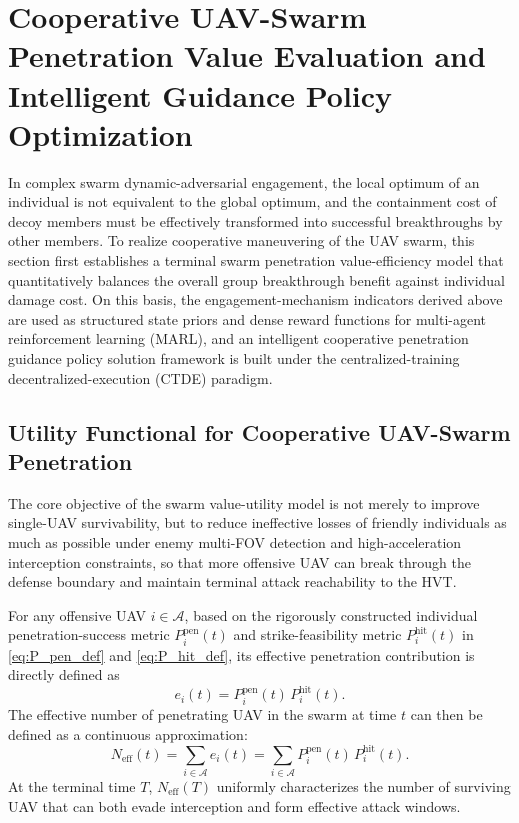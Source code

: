 \documentclass{cja}
\begin{document}
\section{Cooperative UAV-Swarm Penetration Value Evaluation and Intelligent Guidance Policy Optimization}

In complex swarm dynamic-adversarial engagement, the local optimum of an individual is not equivalent to the global optimum, and the containment cost of decoy members must be effectively transformed into successful breakthroughs by other members.
To realize cooperative maneuvering of the UAV swarm, this section first establishes a terminal swarm penetration value-efficiency model that quantitatively balances the overall group breakthrough benefit against individual damage cost. On this basis, the engagement-mechanism indicators derived above are used as structured state priors and dense reward functions for multi-agent reinforcement learning (MARL), and an intelligent cooperative penetration guidance policy solution framework is built under the centralized-training decentralized-execution (CTDE) paradigm.

\subsection{Utility Functional for Cooperative UAV-Swarm Penetration}

The core objective of the swarm value-utility model is not merely to improve single-UAV survivability, but to reduce ineffective losses of friendly individuals as much as possible under enemy multi-FOV detection and high-acceleration interception constraints, so that more offensive UAV can break through the defense boundary and maintain terminal attack reachability to the HVT.

For any offensive UAV $i\in\mathcal{A}$, based on the rigorously constructed individual penetration-success metric $P_i^{\mathrm{pen}}(t)$ and strike-feasibility metric $P_i^{\mathrm{hit}}(t)$ in \eqref{eq:P_pen_def} and \eqref{eq:P_hit_def}, its effective penetration contribution is directly defined as
\begin{equation}
e_i(t)
=
P_i^{\mathrm{pen}}(t)\,P_i^{\mathrm{hit}}(t).
\end{equation}
The effective number of penetrating UAV in the swarm at time $t$ can then be defined as a continuous approximation:
\begin{equation}
N_{\mathrm{eff}}(t)
=
\sum_{i\in\mathcal{A}} e_i(t)
=
\sum_{i\in\mathcal{A}} P_i^{\mathrm{pen}}(t)\,P_i^{\mathrm{hit}}(t).
\end{equation}
At the terminal time $T$, $N_{\mathrm{eff}}(T)$ uniformly characterizes the number of surviving UAV that can both evade interception and form effective attack windows.
\end{document}
